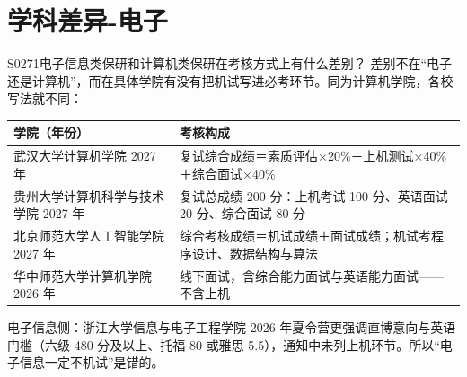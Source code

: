 \section{学科差异-电子}
\begin{qa}{S0271}{电子信息类保研和计算机类保研在考核方式上有什么差别？}
差别不在“电子还是计算机”，而在具体学院有没有把机试写进必考环节。同为计算机学院，各校写法就不同：

\par\vspace{2pt}\nobreak\begin{center}\footnotesize
\begin{tabularx}{\textwidth}{>{\raggedright\arraybackslash}X>{\raggedright\arraybackslash}X}
\toprule
\textbf{学院（年份）} & \textbf{考核构成} \\ \midrule
武汉大学计算机学院 2027 年 & 复试综合成绩＝素质评估×20\%＋上机测试×40\%＋综合面试×40\% \\
贵州大学计算机科学与技术学院 2027 年 & 复试总成绩 200 分：上机考试 100 分、英语面试 20 分、综合面试 80 分 \\
北京师范大学人工智能学院 2027 年 & 综合考核成绩＝机试成绩＋面试成绩；机试考程序设计、数据结构与算法 \\
华中师范大学计算机学院 2026 年 & 线下面试，含综合能力面试与英语能力面试——不含上机 \\
\bottomrule
\end{tabularx}
\end{center}\vspace{2pt}\par

电子信息侧：浙江大学信息与电子工程学院 2026 年夏令营更强调直博意向与英语门槛（六级 480 分及以上、托福 80 或雅思 5.5），通知中未列上机环节。所以“电子信息一定不机试”是错的。
\end{qa}


